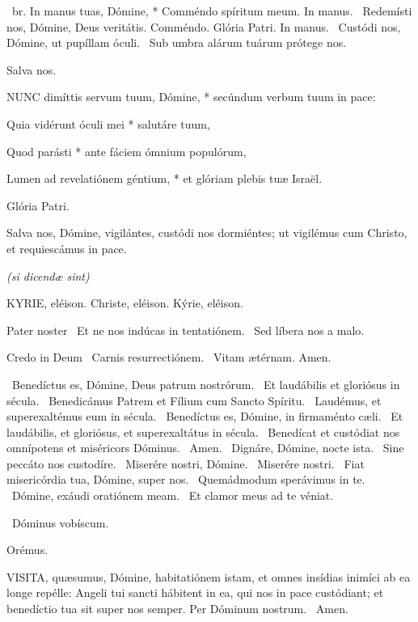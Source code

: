 \R\ br. In manus tuas, Dómine, * Comméndo spíritum meum. In manus. \V\ Redemísti nos, Dómine, Deus veritátis. Comméndo. Glória Patri. In manus. \V\ Custódi nos, Dómine, ut pupíllam óculi. \R\ Sub umbra alárum tuárum prótege nos.

 Salva nos.


\lettrine[lines=2]{N}{UNC} dimíttis servum tuum, Dómine, * secúndum verbum tuum in pace:

Quia vidérunt óculi mei * salutáre tuum,

Quod parásti * ante fáciem ómnium populórum,

Lumen ad revelatiónem géntium, * et glóriam plebis tuæ Israël.

Glória Patri.

 Salva nos, Dómine, vigilántes, custódi nos dormiéntes; ut vigilémus cum Christo, et requiescámus in pace.


\textit{(si dicendæ sint)}

KYRIE, eléison. Christe, eléison. Kýrie, eléison.

Pater noster  \V\ Et ne nos indúcas in tentatiónem. \R\ Sed líbera nos a malo.

Credo in Deum  \V\ Carnis resurrectiónem. \R\ Vitam ætérnam. Amen.

\V\ Benedíctus es, Dómine, Deus patrum nostrórum. \R\ Et laudábilis et gloriósus in sécula. \V\ Benedicámus Patrem et Fílium cum Sancto Spíritu. \R\ Laudémus, et superexaltémus eum in sécula. \V\ Benedíctus es, Dómine, in firmaménto cæli. \R\ Et laudábilis, et gloriósus, et superexaltátus in sécula. \V\ Benedícat et custódiat nos omnípotens et miséricors Dóminus. \R\ Amen. \V\ Dignáre, Dómine, nocte ista. \R\ Sine peccáto nos custodíre. \V\ Miserére nostri, Dómine. \R\ Miserére nostri. \V\ Fiat misericórdia tua, Dómine, super nos. \R\ Quemádmodum sperávimus in te. \V\ Dómine, exáudi oratiónem meam. \R\ Et clamor meus ad te véniat.

\V\ Dóminus vobíscum.

Orémus. 

\lettrine[lines=2]{V}{ISITA}, quæsumus, Dómine, habitatiónem istam, et omnes insídias inimíci ab ea longe repélle: Angeli tui sancti hábitent in ea, qui nos in pace custódiant; et benedíctio tua sit super nos semper. Per Dóminum nostrum. \R\ Amen.

